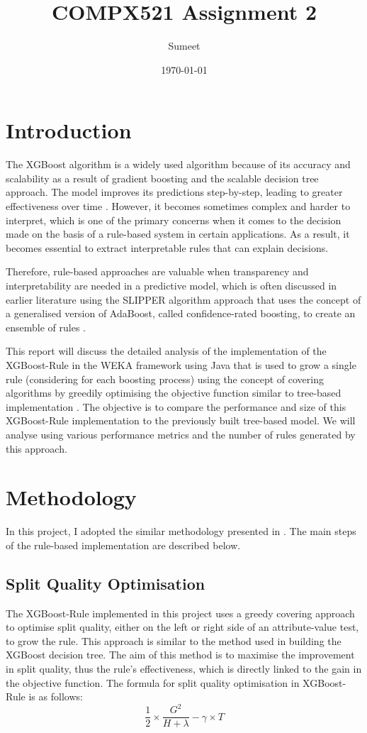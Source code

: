 \documentclass{article}
\title{COMPX521 Assignment 2}
\author{Sumeet}
\date{\today}
\begin{document}
\maketitle

\section{Introduction}
The XGBoost algorithm is a widely used algorithm because of its accuracy and scalability as a result of gradient boosting and the scalable decision tree approach. The model improves its predictions step-by-step, leading to greater effectiveness over time \cite{chen2016xgboost}. However, it becomes sometimes complex and harder to interpret, which is one of the primary concerns when it comes to the decision made on the basis of a rule-based system in certain applications. As a result, it becomes essential to extract interpretable rules that can explain decisions.

Therefore, rule-based approaches are valuable when transparency and interpretability are needed in a predictive model, which is often discussed in earlier literature using the SLIPPER algorithm approach that uses the concept of a generalised version of AdaBoost, called confidence-rated boosting, to create an ensemble of rules \cite{cohen1999simple}.

This report will discuss the detailed analysis of the implementation of the XGBoost-Rule in the WEKA framework \cite{weka_book} using Java that is used to grow a single rule (considering for each boosting process) using the concept of covering algorithms by greedily optimising the objective function similar to tree-based implementation \cite{chen2016xgboost}. The objective is to compare the performance and size of this XGBoost-Rule implementation to the previously built tree-based model. We will analyse using various performance metrics and the number of rules generated by this approach.

\section{Methodology}
In this project, I adopted the similar methodology presented in \cite{rapp2021learning}. The main steps of the rule-based implementation are described below.

\subsection{Split Quality Optimisation}
The XGBoost-Rule implemented in this project uses a greedy covering approach to optimise split quality, either on the left or right side of an attribute-value test, to grow the rule. This approach is similar to the method used in building the XGBoost decision tree. The aim of this method is to maximise the improvement in split quality, thus the rule's effectiveness, which is directly linked to the gain in the objective function. The formula for split quality optimisation in XGBoost-Rule is as follows:
\[
\frac{1}{2} \times \frac{G^2}{H + \lambda} - \gamma \times T
\]
\end{document}
